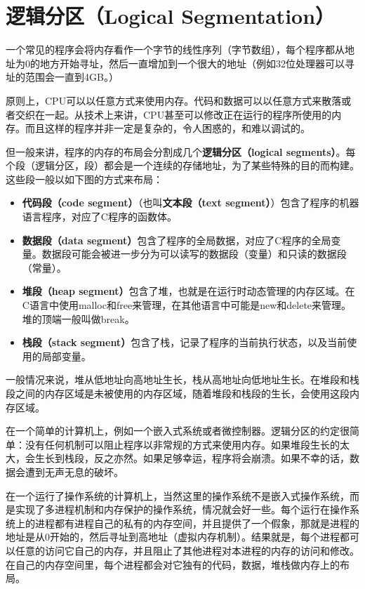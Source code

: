 \documentclass[cn,11pt,chinese]{elegantbook}
\begin{document}
\section{逻辑分区（Logical Segmentation）}

一个常见的程序会将内存看作一个字节的线性序列（字节数组），每个程序都从地址为0的地方开始寻址，然后一直增加到一个很大的地址（例如32位处理器可以寻址的范围会一直到4GB。）

原则上，CPU可以以任意方式来使用内存。代码和数据可以以任意方式来散落或者交织在一起。从技术上来讲，CPU甚至可以修改正在运行的程序所使用的内存。而且这样的程序并非一定是复杂的，令人困惑的，和难以调试的。

但一般来讲，程序的内存的布局会分割成几个\textbf{逻辑分区（logical segments）}。每个段（逻辑分区，段）都会是一个连续的存储地址，为了某些特殊的目的而构建。这些段一般以如下图的方式来布局：

\begin{itemize}
  \item \textbf{代码段（code segment）}（也叫\textbf{文本段（text segment）}）包含了程序的机器语言程序，对应了C程序的函数体。
  \item \textbf{数据段（data segment）}包含了程序的全局数据，对应了C程序的全局变量。数据段可能会被进一步分为可以读写的数据段（变量）和只读的数据段（常量）。
  \item \textbf{堆段（heap segment）}包含了堆，也就是在运行时动态管理的内存区域。在C语言中使用malloc和free来管理，在其他语言中可能是new和delete来管理。堆的顶端一般叫做break。
  \item \textbf{栈段（stack segment）}包含了栈，记录了程序的当前执行状态，以及当前使用的局部变量。
\end{itemize}

一般情况来说，堆从低地址向高地址生长，栈从高地址向低地址生长。在堆段和栈段之间的内存区域是未被使用的内存区域，随着堆段和栈段的生长，会使用这段内存区域。

在一个简单的计算机上，例如一个嵌入式系统或者微控制器。逻辑分区的约定很简单：没有任何机制可以阻止程序以非常规的方式来使用内存。如果堆段生长的太大，会生长到栈段，反之亦然。如果足够幸运，程序将会崩溃。如果不幸的话，数据会遭到无声无息的破坏。

在一个运行了操作系统的计算机上，当然这里的操作系统不是嵌入式操作系统，而是实现了多进程机制和内存保护的操作系统，情况就会好一些。每个运行在操作系统上的进程都有进程自己的私有的内存空间，并且提供了一个假象，那就是进程的地址是从0开始的，然后寻址到高地址（虚拟内存机制）。结果就是，每个进程都可以任意的访问它自己的内存，并且阻止了其他进程对本进程的内存的访问和修改。在自己的内存空间里，每个进程都会对它独有的代码，数据，堆栈做内存上的布局。
\end{document}

